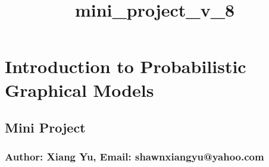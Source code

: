 \documentclass[11pt]{article}
\title{mini\_project\_v\_8}
\begin{document}
    
    
    \maketitle
    
    

    
    \section{Introduction to Probabilistic Graphical
Models}\label{introduction-to-probabilistic-graphical-models}

\subsection{Mini Project}\label{mini-project}

\subsubsection{Author: Xiang Yu, Email:
shawnxiangyu@yahoo.com}\label{author-xiang-yu-email-shawnxiangyuyahoo.com}
\end{document}
